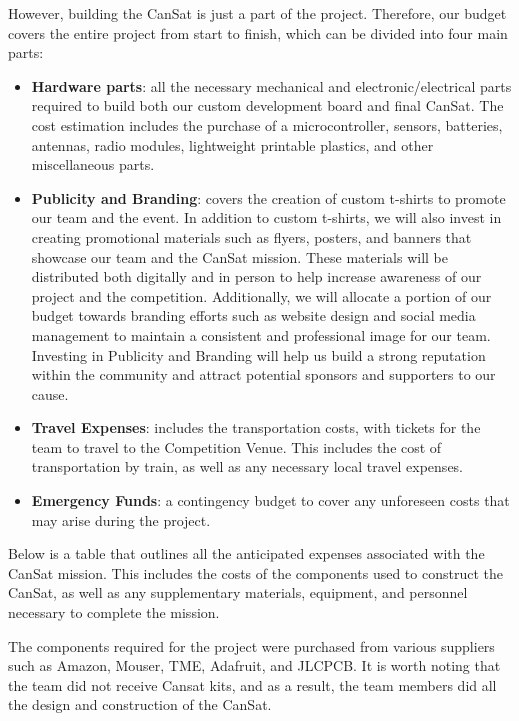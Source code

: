\documentclass[11pt]{article}
\begin{document}
However, building the CanSat is just a part of the project. Therefore, our budget covers the entire project from start to finish, which can be divided into four main parts: 
\begin{itemize}[leftmargin=1cm, itemindent=0.25cm, noitemsep, topsep=0pt, label=$\bullet$]
    \item \textbf{Hardware parts}: all the necessary mechanical and electronic/electrical parts required to build both our custom development board and final CanSat. The cost estimation includes the purchase of a microcontroller, sensors, batteries, antennas, radio modules, lightweight printable plastics, and other miscellaneous parts.
    \item \textbf{Publicity and Branding}: covers the creation of custom t-shirts to promote our team and the event. In addition to custom t-shirts, we will also invest in creating promotional materials such as flyers, posters, and banners that showcase our team and the CanSat mission. These materials will be distributed both digitally and in person to help increase awareness of our project and the competition. Additionally, we will allocate a portion of our budget towards branding efforts such as website design and social media management to maintain a consistent and professional image for our team. Investing in Publicity and Branding will help us build a strong reputation within the community and attract potential sponsors and supporters to our cause.
    \item \textbf{Travel Expenses}: includes the transportation costs, with tickets for the team to travel to the Competition Venue. This includes the cost of transportation by train, as well as any necessary local travel expenses.
    \item \textbf{Emergency Funds}: a contingency budget to cover any unforeseen costs that may arise during the project.
\end{itemize}

Below is a table that outlines all the anticipated expenses associated with the CanSat mission. This includes the costs of the components used to construct the CanSat, as well as any supplementary materials, equipment, and personnel necessary to complete the mission.

The components required for the project were purchased from various suppliers such as Amazon, Mouser, TME, Adafruit, and JLCPCB. It is worth noting that the team did not receive Cansat kits, and as a result, the team members did all the design and construction of the CanSat.
\end{document}
